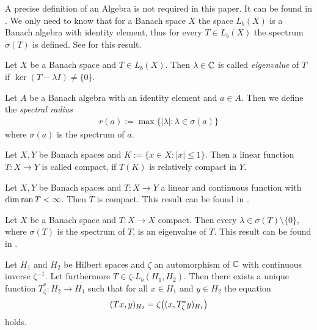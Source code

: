 \begin{remark}
	A precise definition of an Algebra is not required in this paper. It can be found in \cite[p. 122]{FAna1}. We only need to know that for a Banach space $X$ the space $L_b(X)$ is a Banach algebra with identity element, thus for every $T \in L_b(X)$ the spectrum $\sigma(T)$ is defined. See \cite[p.121-122]{FAna1} for this result. 
\end{remark}

\begin{definition}
	Let $X$ be a Banach space and $T \in L_b(X)$. Then $\lambda \in \mathbb{C}$ is called \textit{eigenvalue} of $T$ if $\ker(T - \lambda I) \neq \{0\}$. 
\end{definition}

\begin{definition}
	Let $A$ be a Banach algebra with an identity element and $a \in A$. Then we define the \textit{spectral radius}
	\begin{align*}
		r(a) := \max\{|\lambda| : \lambda \in \sigma(a)\}
	\end{align*}
	where $\sigma(a)$ is the spectrum of $a$.
\end{definition}

\begin{definition}
	Let $X, Y$ be Banach spaces and $K := \{x \in X: |x| \leq 1\}$. Then a linear function $T: X \to Y$ is called compact, if $T(K)$ is relatively compact in $Y$. 
\end{definition}

\begin{remark} \label{remark:compact}
	Let $X, Y$ be Banach spaces and $T:X \to Y$ a linear and continuous function with $\dim \operatorname{ran} T < \infty$. Then $T$ is compact. This result can be found in \cite[p. 133]{FAna1}.
\end{remark}

\begin{remark} \label{remark:compact_spectrum}
	Let $X$ be a Banach space and $T: X \to X$ compact. Then every $\lambda \in \sigma(T) \setminus\{0\}$, where $\sigma(T)$ is the spectrum of $T$, is an eigenvalue of $T$. This result can be found in \cite[p.138]{FAna1}.
\end{remark}

\begin{lemma}
	Let $H_1$ and $H_2$ be Hilbert spaces and $\zeta$ an automorphism of $\mathbb{C}$ with continuous inverse $\zeta^{-1}$. Let furthermore $T \in \zeta\text{-}L_b(H_1, H_2)$. Then there exists a unique function $T_\zeta^\ast: H_2 \to H_1$ such that for all $x \in H_1$ and $y \in H_2$ the equation 
	\begin{align*}
		(Tx, y)_{H_2} = \zeta{\left ( (x, T_\zeta^\ast y)_{H_1} \right )}
	\end{align*}
	holds. 
\end{lemma}


